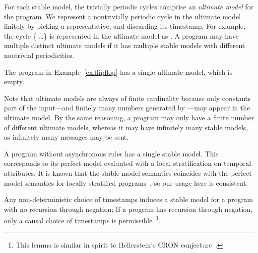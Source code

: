 \begin{definition}
For each stable model, the trivially periodic cycles comprise an {\em ultimate model} for the program.  We represent a nontrivially periodic cycle in the ultimate model finitely by picking a representative, and discarding its timestamp.  For example, the cycle \{ \ldots\} is represented in the ultimate model as .  A program may have multiple distinct ultimate models if it has multiple stable models with different nontrivial periodicities.
\end{definition}

The program in Example~\ref{ex:flipflop} has a single ultimate model, which is empty.

Note that ultimate models are always of finite cardinality because only constants part of the input---and finitely many numbers generated by ---may appear in the ultimate model.  By the same reasoning, a \lang program may only have a finite number of different ultimate models, whereas it may have infinitely many stable models, as infinitely many messages may be sent.
%

A \lang program without asynchronous rules has a single stable model.  This corresponds to its perfect model evaluated with a local stratification on temporal attributes.  It is known that the stable model semantics coincides with the perfect model semantics for locally stratified programs~\cite{stable-model}, so our usage here is consistent.


\begin{lemma}
Any non-deterministic choice of timestamps induces a stable model for a \lang program with no recursion through negation; If a \lang program has recursion through negation, only a causal choice of timestamps is permissible~\footnote{This lemma is similar in spirit to Hellerstein's CRON conjecture~\cite{declarative-imperative}.}.
\end{lemma}

